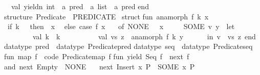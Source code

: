 \begin{isabellebody}
\ \ val\ yieldn{\isacharcolon}{\kern0pt}\ int\ {\isacharminus}{\kern0pt}{\isachargreater}{\kern0pt}\ {\isacharprime}{\kern0pt}a\ pred\ {\isacharminus}{\kern0pt}{\isachargreater}{\kern0pt}\ {\isacharprime}{\kern0pt}a\ list\ {\isacharasterisk}{\kern0pt}\ {\isacharprime}{\kern0pt}a\ pred\isanewline
end{\isacharsemicolon}{\kern0pt}\isanewline
\isanewline
structure\ Predicate\ {\isacharcolon}{\kern0pt}\ PREDICATE\ {\isacharequal}{\kern0pt}\isanewline
struct\isanewline
\isanewline
fun\ anamorph\ f\ k\ x\ {\isacharequal}{\kern0pt}\isanewline
\ {\isacharparenleft}{\kern0pt}if\ k\ {\isacharequal}{\kern0pt}\ {}\ then\ {\isacharparenleft}{\kern0pt}{\isacharbrackleft}{\kern0pt}{\isacharbrackright}{\kern0pt}{\isacharcomma}{\kern0pt}\ x{\isacharparenright}{\kern0pt}\isanewline
\ \ else\ case\ f\ x\isanewline
\ \ \ of\ NONE\ {\isacharequal}{\kern0pt}{\isachargreater}{\kern0pt}\ {\isacharparenleft}{\kern0pt}{\isacharbrackleft}{\kern0pt}{\isacharbrackright}{\kern0pt}{\isacharcomma}{\kern0pt}\ x{\isacharparenright}{\kern0pt}\isanewline
\ \ \ \ {\isacharbar}{\kern0pt}\ SOME\ {\isacharparenleft}{\kern0pt}v{\isacharcomma}{\kern0pt}\ y{\isacharparenright}{\kern0pt}\ {\isacharequal}{\kern0pt}{\isachargreater}{\kern0pt}\ let\isanewline
\ \ \ \ \ \ \ \ val\ k{\isacharprime}{\kern0pt}\ {\isacharequal}{\kern0pt}\ k\ {\isacharminus}{\kern0pt}\ {}{\isacharsemicolon}{\kern0pt}\isanewline
\ \ \ \ \ \ \ \ val\ {\isacharparenleft}{\kern0pt}vs{\isacharcomma}{\kern0pt}\ z{\isacharparenright}{\kern0pt}\ {\isacharequal}{\kern0pt}\ anamorph\ f\ k{\isacharprime}{\kern0pt}\ y\isanewline
\ \ \ \ \ \ in\ {\isacharparenleft}{\kern0pt}v\ {\isacharcolon}{\kern0pt}{\isacharcolon}{\kern0pt}\ vs{\isacharcomma}{\kern0pt}\ z{\isacharparenright}{\kern0pt}\ end{\isacharparenright}{\kern0pt}{\isacharsemicolon}{\kern0pt}\isanewline
\isanewline
datatype\ pred\ {\isacharequal}{\kern0pt}\ datatype\ Predicate{\isachardot}{\kern0pt}pred\isanewline
datatype\ seq\ {\isacharequal}{\kern0pt}\ datatype\ Predicate{\isachardot}{\kern0pt}seq\isanewline
\isanewline
fun\ map\ f\ {\isacharequal}{\kern0pt}\ {\isacharat}{\kern0pt}{\isacharbraceleft}{\kern0pt}code\ Predicate{\isachardot}{\kern0pt}map{\isacharbraceright}{\kern0pt}\ f{\isacharsemicolon}{\kern0pt}\isanewline
\isanewline
fun\ yield\ {\isacharparenleft}{\kern0pt}Seq\ f{\isacharparenright}{\kern0pt}\ {\isacharequal}{\kern0pt}\ next\ {\isacharparenleft}{\kern0pt}f\ {\isacharparenleft}{\kern0pt}{\isacharparenright}{\kern0pt}{\isacharparenright}{\kern0pt}\isanewline
and\ next\ Empty\ {\isacharequal}{\kern0pt}\ NONE\isanewline
\ \ {\isacharbar}{\kern0pt}\ next\ {\isacharparenleft}{\kern0pt}Insert\ {\isacharparenleft}{\kern0pt}x{\isacharcomma}{\kern0pt}\ P{\isacharparenright}{\kern0pt}{\isacharparenright}{\kern0pt}\ {\isacharequal}{\kern0pt}\ SOME\ {\isacharparenleft}{\kern0pt}x{\isacharcomma}{\kern0pt}\ P{\isacharparenright}{\kern0pt}\isanewline

\end{isabellebody}
